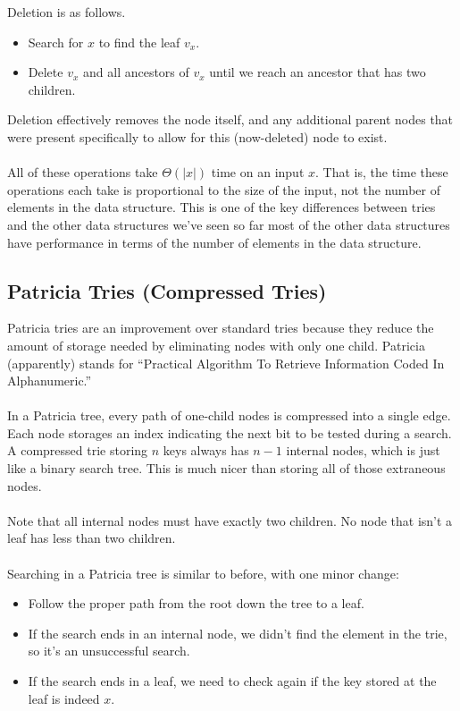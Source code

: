 \documentclass[]{article}
\theoremstyle{definition}
\begin{document}
		Deletion is as follows.
		\begin{itemize}
			\item Search for $x$ to find the leaf $v_x$.
			\item Delete $v_x$ and all ancestors of $v_x$ until we reach an ancestor that has two children.
		\end{itemize}

		Deletion effectively removes the node itself, and any additional parent nodes that were present specifically to allow for this (now-deleted) node to exist.
		\\ \\
		All of these operations take $\Theta(|x|)$ time on an input $x$. That is, the time these operations each take is proportional to the size of the input, not the number of elements in the data structure. This is one of the key differences between tries and the other data structures we've seen so far \textendash{} most of the other data structures have performance in terms of the number of elements in the data structure.

		\subsection{Patricia Tries (Compressed Tries)}
			Patricia tries are an improvement over standard tries because they reduce the amount of storage needed by eliminating nodes with only one child. Patricia (apparently) stands for ``Practical Algorithm To Retrieve Information Coded In Alphanumeric.''
			\\ \\
			In a Patricia tree, every path of one-child nodes is compressed into a single edge. Each node storages an index indicating the next bit to be tested during a search. A compressed trie storing $n$ keys always has $n - 1$ internal nodes, which is just like a binary search tree. This is much nicer than storing all of those extraneous nodes.
			\\ \\
			Note that all internal nodes must have exactly two children. No node that isn't a leaf has less than two children.
			\\ \\
			Searching in a Patricia tree is similar to before, with one minor change:
			\begin{itemize}
				\item Follow the proper path from the root down the tree to a leaf.
				\item If the search ends in an internal node, we didn't find the element in the trie, so it's an unsuccessful search.
				\item If the search ends in a leaf, we need to check again if the key stored at the leaf is indeed $x$.
			\end{itemize}
\end{document}
